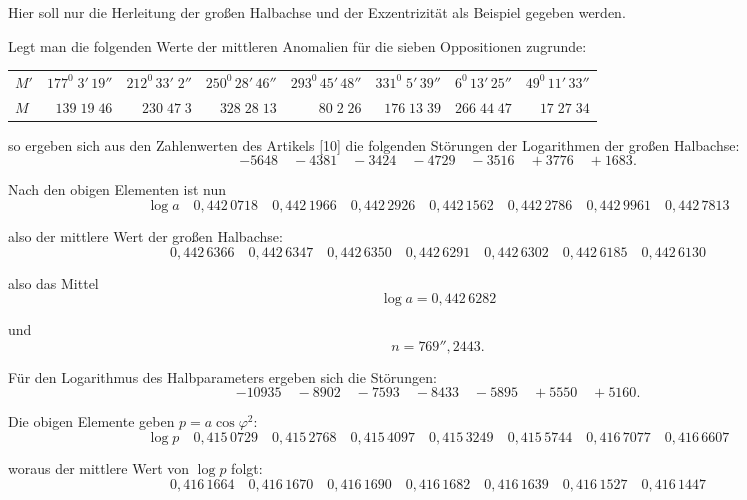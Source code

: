 \begin{landscape}
\endgroup
\par\noindent\hspace*{\parindent}Hier soll nur die Herleitung der großen Halbachse und der Exzentrizität als Beispiel gegeben werden.
\par\noindent\hspace*{\parindent}Legt man die folgenden Werte der mittleren Anomalien für die sieben Oppositionen zugrunde:
\begingroup
\small\setlength{\tabcolsep}{5pt}\renewcommand{\arraystretch}{1.18}
\begin{center}
\begin{tabular}{@{}lrrrrrrr@{}}
\(M'\)&\(177^0\;3'\,19''\)&\(212^0\,33'\;2''\)&\(250^0\,28'\,46''\)&\(293^0\,45'\,48''\)&\(331^0\;5'\,39''\)&\(6^0\,13'\,25''\)&\(49^0\,11'\,33''\)\\
\(M\)&\(139\;19\;46\)&\(230\;47\;3\)&\(328\;28\;13\)&\(80\;2\;26\)&\(176\;13\;39\)&\(266\;44\;47\)&\(17\;27\;34\)
\end{tabular}
\end{center}
\endgroup
\par\noindent so ergeben sich aus den Zahlenwerten des Artikels [10] die folgenden Störungen der Logarithmen der großen Halbachse:
\[
-5648\quad-4381\quad-3424\quad-4729\quad-3516\quad+3776\quad+1683.
\]
\par\noindent Nach den obigen Elementen ist nun
\[
\log a\quad 0{,}442\,0718\quad0{,}442\,1966\quad0{,}442\,2926\quad0{,}442\,1562\quad0{,}442\,2786\quad0{,}442\,9961\quad0{,}442\,7813
\]
\par\noindent also der mittlere Wert der großen Halbachse:
\[
0{,}442\,6366\quad0{,}442\,6347\quad0{,}442\,6350\quad0{,}442\,6291\quad0{,}442\,6302\quad0{,}442\,6185\quad0{,}442\,6130
\]
\par\noindent also das Mittel
\[
\log a=0{,}442\,6282
\]
\par\noindent und
\[
n=769''{,}2443.
\]
\par\noindent\hspace*{\parindent}Für den Logarithmus des Halbparameters ergeben sich die Störungen:
\[
-10935\quad-8902\quad-7593\quad-8433\quad-5895\quad+5550\quad+5160.
\]
\par\noindent Die obigen Elemente geben \(p=a\cos\varphi^2\):
\[
\log p\quad0{,}415\,0729\quad0{,}415\,2768\quad0{,}415\,4097\quad0{,}415\,3249\quad0{,}415\,5744\quad0{,}416\,7077\quad0{,}416\,6607
\]
\par\noindent woraus der mittlere Wert von \(\log p\) folgt:
\[
0{,}416\,1664\quad0{,}416\,1670\quad0{,}416\,1690\quad0{,}416\,1682\quad0{,}416\,1639\quad0{,}416\,1527\quad0{,}416\,1447
\]
\end{landscape}

